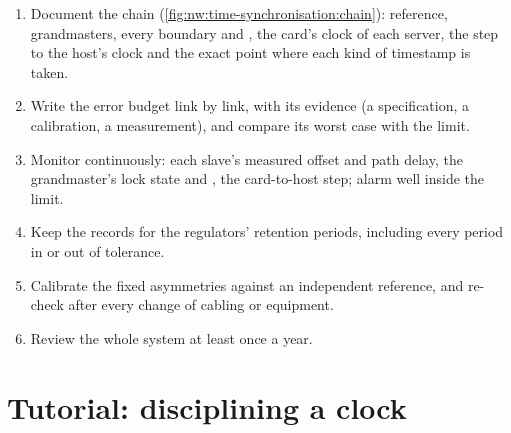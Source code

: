 \begin{method}\label{met:nw:time-synchronisation:prove}
\begin{enumerate}
\item Document the chain (\cref{fig:nw:time-synchronisation:chain}): reference, grandmasters, every boundary and , the
  card's clock of each server, the step to the host's clock and the exact point where each kind of timestamp is taken.
\item Write the error budget link by link, with its evidence (a specification, a calibration, a measurement), and compare its worst
  case with the limit.
\item Monitor continuously: each slave's measured offset and path delay, the grandmaster's lock state and , the card-to-host
  step; alarm well inside the limit.
\item Keep the records for the regulators' retention periods, including every period in  or out of tolerance.
\item Calibrate the fixed asymmetries against an independent reference, and re-check after every change of cabling or equipment.
\item Review the whole system at least once a year.
\end{enumerate}
\end{method}

\section{Tutorial: disciplining a clock}\label{tut:nw:time-synchronisation:tut}

